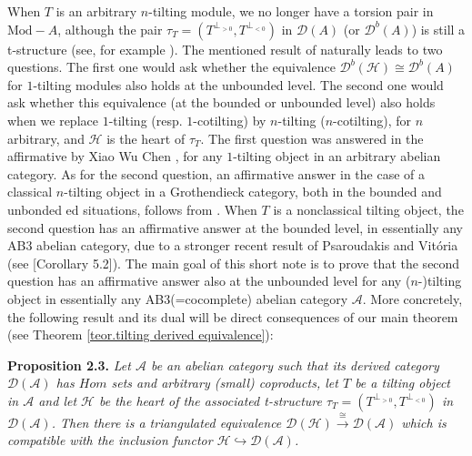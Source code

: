 \documentclass{proc-l}
\theoremstyle{definition}
\theoremstyle{remark}
\numberwithin{equation}{section}
\begin{document}
When $T$ is an arbitrary $n$-tilting module, we no longer have a torsion pair in $\text{Mod}-A$, although the pair $\tau_T=(T^{\perp_{>0}},T^{\perp_{<0}})$ in $\mathcal{D}(A)$ (or $\mathcal{D}^b(A)$) is still a t-structure (see, for example \cite{NSZM}). The mentioned result of \cite{HRS} naturally leads to two questions. The first one would ask whether the equivalence $\mathcal{D}^b(\mathcal{H})\cong\mathcal{D}^b(A)$ for $1$-tilting modules  also holds at the unbounded level. The second one would ask whether this equivalence (at the bounded or unbounded level) also holds when we replace $1$-tilting (resp. $1$-cotilting) by $n$-tilting ($n$-cotilting), for $n$ arbitrary, and $\mathcal{H}$ is the heart of $\tau_T$. The first question was answered in the affirmative by Xiao Wu Chen \cite{Chen}, for any $1$-tilting object in an arbitrary abelian category. As for  the second question, an affirmative answer in the case of a classical $n$-tilting object in a Grothendieck category, both in the bounded and unbonded
 ed situations,  follows from \cite{FMT}. When $T$ is a nonclassical tilting object, the second question has an affirmative answer at  the bounded level, in essentially any AB3 abelian category,  due to a stronger recent result of Psaroudakis and Vit\'oria (see \cite{PV}[Corollary 5.2]). The main goal of this short note is to prove that the second question  has an affirmative answer also at the unbounded level for any ($n$-)tilting object in essentially any AB3(=cocomplete) abelian category $\mathcal{A}$. More concretely, the following result and its dual will be direct consequences of our main theorem (see Theorem \ref{teor.tilting derived equivalence}):

\vspace*{0.3cm}
{\bf\noindent Proposition 2.3.} {\it Let  $\mathcal{A}$ be an abelian category such that its derived category $\mathcal{D}(\mathcal{A})$ has $Hom$ sets and arbitrary (small) coproducts, let $T$ be a tilting object in $\mathcal{A}$ 
and let $\mathcal{H}$ be the heart of the associated t-structure $\tau_T=(T^{\perp_{>0}},T^{\perp_{<0}})$ in $\mathcal{D}(\mathcal{A})$. Then there is a triangulated equivalence $\mathcal{D}(\mathcal{H})\stackrel{\cong}{\longrightarrow}\mathcal{D}(\mathcal{A})$ which is compatible with the inclusion functor $\mathcal{H}\hookrightarrow\mathcal{D}(\mathcal{A})$.
}
\end{document}
